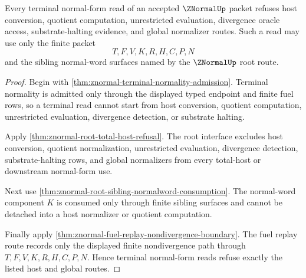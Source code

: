 \begin{theorem}
\label{thm:znormal-terminal-normal-form-refusal}
Every terminal normal-form read of an accepted $\ZNormalUp$ packet refuses host conversion, quotient computation, unrestricted evaluation, divergence oracle access, substrate-halting evidence, and global normalizer routes. Such a read may use only the finite packet
$$
T,F,V,K,R,H,C,P,N
$$
and the sibling normal-word surfaces named by the $\ZNormalUp$ root route.
\end{theorem}
\begin{proof}
Begin with \autoref{thm:znormal-terminal-normality-admission}. Terminal normality is admitted only through the displayed typed endpoint and finite fuel rows, so a terminal read cannot start from host conversion, quotient computation, unrestricted evaluation, divergence detection, or substrate halting.

Apply \autoref{thm:znormal-root-total-host-refusal}. The root interface excludes host conversion, quotient normalization, unrestricted evaluation, divergence detection, substrate-halting rows, and global normalizers from every total-host or downstream normal-form use.

Next use \autoref{thm:znormal-root-sibling-normalword-consumption}. The normal-word component $K$ is consumed only through finite sibling surfaces and cannot be detached into a host normalizer or quotient computation.

Finally apply \autoref{thm:znormal-fuel-replay-nondivergence-boundary}. The fuel replay route records only the displayed finite nondivergence path through $T,F,V,K,R,H,C,P,N$. Hence terminal normal-form reads refuse exactly the listed host and global routes.
\end{proof}

